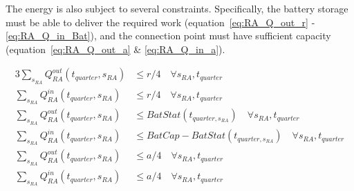 The energy is also subject to several constraints. Specifically,
the battery storage must be able to deliver the required work (equation~\ref{eq:RA_Q_out_r} - \ref{eq:RA_Q_in_Bat}),
and the connection point must have sufficient capacity (equation~\ref{eq:RA_Q_out_a} \& \ref{eq:RA_Q_in_a}).

\begin{alignat}{3}
	\sum_{s_{RA}} Q^{out}_{RA}(t_{quarter}, s_{RA}) & \leq r/4 \quad \forall s_{RA}, t_{quarter} \label{eq:RA_Q_out_r}                                    \\
	\sum_{s_{RA}} Q^{in}_{RA}(t_{quarter}, s_{RA})  & \leq r/4 \quad \forall s_{RA}, t_{quarter} \label{eq:RA_Q_in_r}                                     \\
	\sum_{s_{RA}} Q^{out}_{RA}(t_{quarter}, s_{RA}) & \leq BatStat(t_{quarter, s_{RA}}) \quad \forall s_{RA}, t_{quarter} \label{eq:RA_Q_out_Bat}         \\
	\sum_{s_{RA}} Q^{in}_{RA}(t_{quarter}, s_{RA})  & \leq BatCap - BatStat(t_{quarter, s_{RA}}) \quad \forall s_{RA}, t_{quarter} \label{eq:RA_Q_in_Bat} \\
	\sum_{s_{RA}} Q^{out}_{RA}(t_{quarter}, s_{RA}) & \leq a/4 \quad \forall s_{RA}, t_{quarter} \label{eq:RA_Q_out_a}                                    \\
	\sum_{s_{RA}} Q^{in}_{RA}(t_{quarter}, s_{RA})  & \leq a/4 \quad \forall s_{RA}, t_{quarter} \label{eq:RA_Q_in_a}
\end{alignat}

